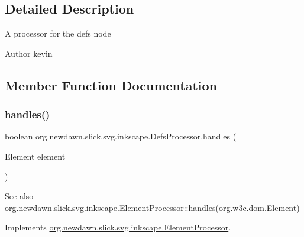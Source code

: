 \subsection{Detailed Description}
A processor for the defs node

\begin{DoxyAuthor}{Author}
kevin 
\end{DoxyAuthor}


\subsection{Member Function Documentation}
\mbox{\label{classorg_1_1newdawn_1_1slick_1_1svg_1_1inkscape_1_1_defs_processor_a648d4dd3a482f1a7f329a7b1ae27e387}} 
\subsubsection{\texorpdfstring{handles()}{handles()}}
{\footnotesize\ttfamily boolean org.\+newdawn.\+slick.\+svg.\+inkscape.\+Defs\+Processor.\+handles (\begin{DoxyParamCaption}\item[{Element}]{element }\end{DoxyParamCaption})\hspace{0.3cm}{\ttfamily [inline]}}

\begin{DoxySeeAlso}{See also}
\mbox{\hyperlink{interfaceorg_1_1newdawn_1_1slick_1_1svg_1_1inkscape_1_1_element_processor_ae95bbf21a67c52aff02cf09259c554a3}{org.\+newdawn.\+slick.\+svg.\+inkscape.\+Element\+Processor\+::handles}}(org.\+w3c.\+dom.\+Element) 
\end{DoxySeeAlso}


Implements \mbox{\hyperlink{interfaceorg_1_1newdawn_1_1slick_1_1svg_1_1inkscape_1_1_element_processor_ae95bbf21a67c52aff02cf09259c554a3}{org.\+newdawn.\+slick.\+svg.\+inkscape.\+Element\+Processor}}.


